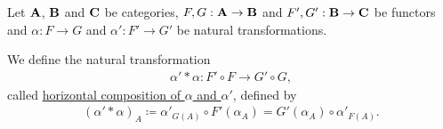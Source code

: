 \begin{definition}\label{def:natural_transformation_horizontal_composition}\cite[remarks 1.3.24]{Leinster2014}
  Let $\operatorname{\mathbf{A}}$, $\operatorname{\mathbf{B}}$ and $\operatorname{\mathbf{C}}$ be categories, $F, G: \operatorname{\mathbf{A}} \to \operatorname{\mathbf{B}}$ and $F', G': \operatorname{\mathbf{B}} \to \operatorname{\mathbf{C}}$ be functors and $\alpha: F \to G$ and $\alpha': F' \to G'$ be natural transformations.
  \begin{center}
  \end{center}

  We define the natural transformation
  \begin{align*}
    \alpha' * \alpha: F' \circ F \to G' \circ G,
  \end{align*}
  called \uline{horizontal composition of $\alpha$ and $\alpha'$}, defined by
  \begin{align*}
    (\alpha' * \alpha)_A \coloneqq \alpha'_{G(A)} \circ F'(\alpha_A) = G'(\alpha_A) \circ \alpha'_{F(A)}.
  \end{align*}
\end{definition}

